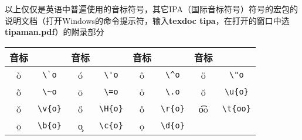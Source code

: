 以上仅仅是英语中普遍使用的音标符号，其它IPA（国际音标符号）符号的 宏包的说明文档（打开Windows的命令提示符，输入{\bfseries\times texdoc tipa}，在打开的窗口中选
\textbf{\times tipaman.pdf}）的附录部分

\begin{table}[H]
\centering
\begin{tabular}{|*{8}{c|}}\hline
音标 &  &音标 &  &音标 & &音标 &  \\
\hline
\`o & \verb|\`o| &
\'o & \verb|\'o| &
\^o & \verb|\^o| &
\"o & \verb|\"o| \\\hline
\~o & \verb|\~o| &
\=o & \verb|\=o| &
\.o & \verb|\.o| &
\u{o} & \verb|\u{o}| \\\hline
\v{o} & \verb|\v{o}| &
\H{o} & \verb|\H{o}| &
\r{o} & \verb|\r{o}| &
\t{oo} & \verb|\t{oo}| \\\hline
\b{o} & \verb|\b{o}| &
\c{o} & \verb|\c{o}| &
\d{o} & \verb|\d{o}| &
& \\\hline
\end{tabular}
\end{table}